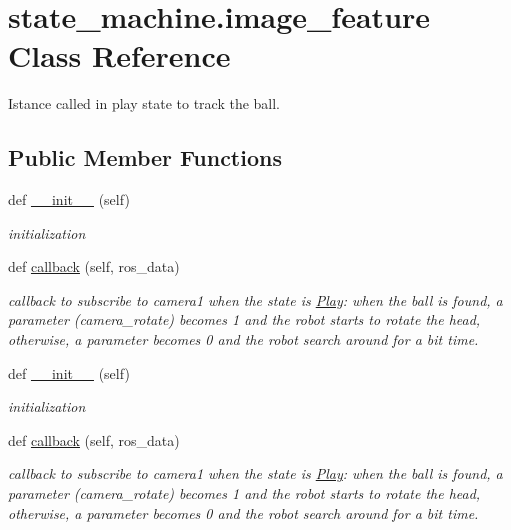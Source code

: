 \hypertarget{classstate__machine_1_1image__feature}{}\section{state\+\_\+machine.\+image\+\_\+feature Class Reference}
\label{classstate__machine_1_1image__feature}


Istance called in play state to track the ball.  


\subsection*{Public Member Functions}
\begin{DoxyCompactItemize}
\item 
def \hyperlink{classstate__machine_1_1image__feature_a719ee46dbe292cfe76d9b20b3d752b9e}{\+\_\+\+\_\+init\+\_\+\+\_\+} (self)
\begin{DoxyCompactList}\small\item\em initialization \end{DoxyCompactList}\item 
def \hyperlink{classstate__machine_1_1image__feature_a18e75f60a2a7f566add766b5f892c6f5}{callback} (self, ros\+\_\+data)
\begin{DoxyCompactList}\small\item\em callback to subscribe to camera1 when the state is \hyperlink{classstate__machine_1_1Play}{Play}\+: when the ball is found, a parameter (camera\+\_\+rotate) becomes 1 and the robot starts to rotate the head, otherwise, a parameter becomes 0 and the robot search around for a bit time. \end{DoxyCompactList}\item 
def \hyperlink{classstate__machine_1_1image__feature_a719ee46dbe292cfe76d9b20b3d752b9e}{\+\_\+\+\_\+init\+\_\+\+\_\+} (self)
\begin{DoxyCompactList}\small\item\em initialization \end{DoxyCompactList}\item 
def \hyperlink{classstate__machine_1_1image__feature_a18e75f60a2a7f566add766b5f892c6f5}{callback} (self, ros\+\_\+data)
\begin{DoxyCompactList}\small\item\em callback to subscribe to camera1 when the state is \hyperlink{classstate__machine_1_1Play}{Play}\+: when the ball is found, a parameter (camera\+\_\+rotate) becomes 1 and the robot starts to rotate the head, otherwise, a parameter becomes 0 and the robot search around for a bit time. \end{DoxyCompactList}\end{DoxyCompactItemize}
